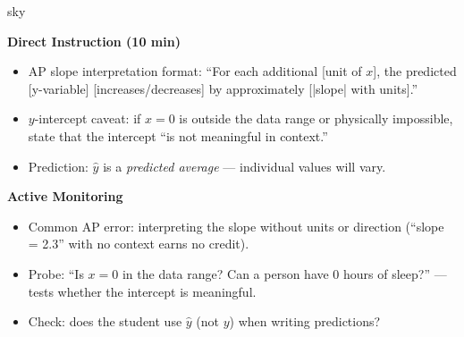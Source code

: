 \documentclass[10pt]{article}
\begin{document}
\begin{skillbox}{sky}
\begin{minipage}[t]{0.48\linewidth}
    \textbf{Direct Instruction (10 min)}
    \begin{itemize}
        \item AP slope interpretation format: ``For each additional [unit of $x$], the predicted [y-variable] [increases/decreases] by approximately [|slope| with units].''
        \item $y$-intercept caveat: if $x = 0$ is outside the data range or physically impossible, state that the intercept ``is not meaningful in context.''
        \item Prediction: $\hat{y}$ is a \textit{predicted average} --- individual values will vary.
    \end{itemize}
\end{minipage}
\hfill
\begin{minipage}[t]{0.48\linewidth}
    \textbf{Active Monitoring}
    \begin{itemize}
        \item Common AP error: interpreting the slope without units or direction (``slope = 2.3'' with no context earns no credit).
        \item Probe: ``Is $x = 0$ in the data range? Can a person have 0 hours of sleep?'' --- tests whether the intercept is meaningful.
        \item Check: does the student use $\hat{y}$ (not $y$) when writing predictions?
    \end{itemize}
\end{minipage}
\end{skillbox}
\end{document}
